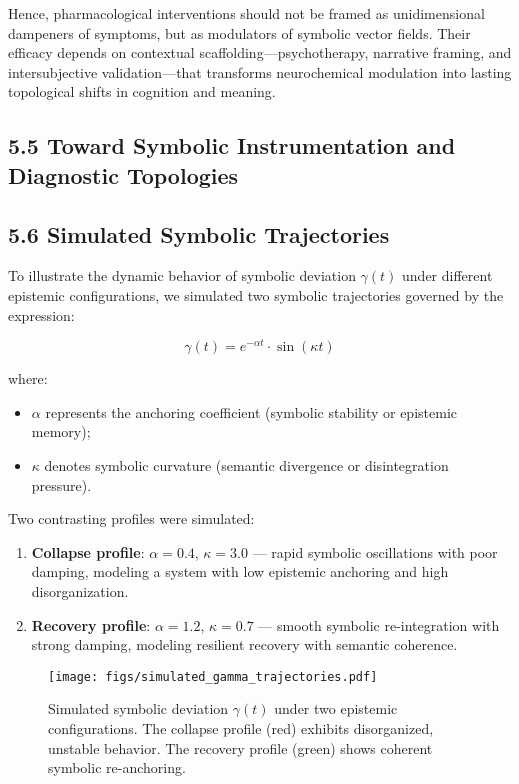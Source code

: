 Hence, pharmacological interventions should not be framed as unidimensional dampeners of symptoms, but as modulators of symbolic vector fields. Their efficacy depends on contextual scaffolding—psychotherapy, narrative framing, and intersubjective validation—that transforms neurochemical modulation into lasting topological shifts in cognition and meaning.


\subsection*{5.5 Toward Symbolic Instrumentation and Diagnostic Topologies}


\subsection*{5.6 Simulated Symbolic Trajectories}

To illustrate the dynamic behavior of symbolic deviation $\gamma(t)$ under different epistemic configurations, we simulated two symbolic trajectories governed by the expression:

\begin{equation}
\gamma(t) = e^{-\alpha t} \cdot \sin(\kappa t)
\end{equation}

where:
\begin{itemize}
  \item $\alpha$ represents the anchoring coefficient (symbolic stability or epistemic memory);
  \item $\kappa$ denotes symbolic curvature (semantic divergence or disintegration pressure).
\end{itemize}

Two contrasting profiles were simulated:

\begin{enumerate}
  \item \textbf{Collapse profile}: $\alpha = 0.4$, $\kappa = 3.0$ — rapid symbolic oscillations with poor damping, modeling a system with low epistemic anchoring and high disorganization.
  \item \textbf{Recovery profile}: $\alpha = 1.2$, $\kappa = 0.7$ — smooth symbolic re-integration with strong damping, modeling resilient recovery with semantic coherence.
\end{enumerate}

\begin{figure}
  \centering
  \texttt{[image: figs/simulated\_gamma\_trajectories.pdf]}
  \caption{Simulated symbolic deviation $\gamma(t)$ under two epistemic configurations. The collapse profile (red) exhibits disorganized, unstable behavior. The recovery profile (green) shows coherent symbolic re-anchoring.}
  \label{fig:gamma_simulation}
\end{figure}

